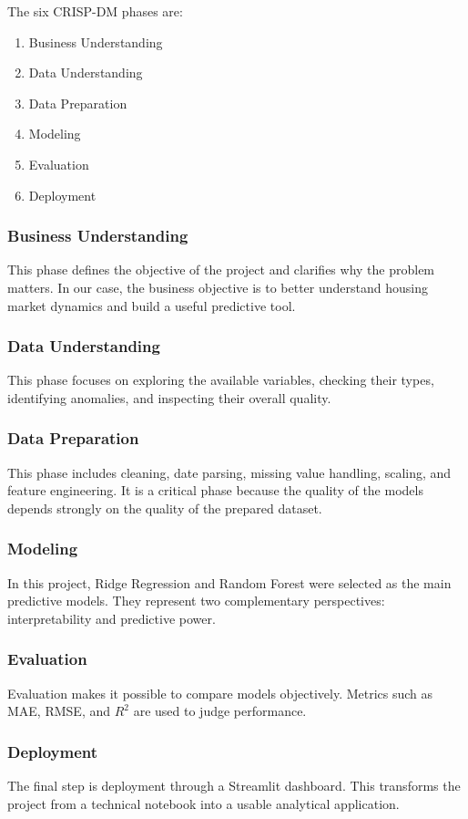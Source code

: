 The six CRISP-DM phases are:
\begin{enumerate}
\item Business Understanding
\item Data Understanding
\item Data Preparation
\item Modeling
\item Evaluation
\item Deployment
\end{enumerate}

\subsubsection{Business Understanding}
This phase defines the objective of the project and clarifies why the problem matters.
In our case, the business objective is to better understand housing market dynamics and build a useful predictive tool.

\subsubsection{Data Understanding}
This phase focuses on exploring the available variables, checking their types, identifying anomalies, and inspecting their overall quality.

\subsubsection{Data Preparation}
This phase includes cleaning, date parsing, missing value handling, scaling, and feature engineering.
It is a critical phase because the quality of the models depends strongly on the quality of the prepared dataset.

\subsubsection{Modeling}
In this project, Ridge Regression and Random Forest were selected as the main predictive models.
They represent two complementary perspectives: interpretability and predictive power.

\subsubsection{Evaluation}
Evaluation makes it possible to compare models objectively.
Metrics such as MAE, RMSE, and \(R^2\) are used to judge performance.

\subsubsection{Deployment}
The final step is deployment through a Streamlit dashboard.
This transforms the project from a technical notebook into a usable analytical application.

